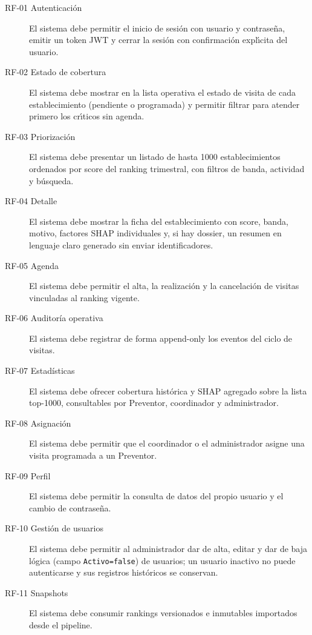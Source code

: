 \begin{description}
	\item[RF-01 Autenticaci\'on] El sistema debe permitir el inicio de sesi\'on con usuario y contrase\~na, emitir un token JWT y cerrar la sesi\'on con confirmaci\'on expl\'{\i}cita del usuario.
	\item[RF-02 Estado de cobertura] El sistema debe mostrar en la lista operativa el estado de visita de cada establecimiento (pendiente o programada)  y permitir filtrar para atender primero los cr\'{\i}ticos sin agenda.
	\item[RF-03 Priorizaci\'on] El sistema debe presentar un listado de hasta 1000 establecimientos ordenados por score del ranking trimestral, con filtros de banda, actividad y b\'usqueda.
	\item[RF-04 Detalle] El sistema debe mostrar la ficha del establecimiento con score, banda, motivo, factores SHAP individuales y, si hay dossier, un resumen en lenguaje claro generado sin enviar identificadores.
	\item[RF-05 Agenda] El sistema debe permitir el alta, la realizaci\'on y la cancelaci\'on de visitas vinculadas al ranking vigente. 
	\item[RF-06 Auditor\'ia operativa] El sistema debe registrar de forma append-only los eventos del ciclo de visitas.
	\item[RF-07 Estad\'isticas] El sistema debe ofrecer cobertura hist\'orica y SHAP agregado sobre la lista top-1000, consultables por Preventor, coordinador y administrador.
	\item[RF-08 Asignaci\'on] El sistema debe permitir que el coordinador o el administrador asigne una visita programada a un Preventor. 
	\item[RF-09 Perfil] El sistema debe permitir la consulta de datos del propio usuario y el cambio de contrase\~na.
	\item[RF-10 Gesti\'on de usuarios] El sistema debe permitir al administrador dar de alta, editar y dar de baja l\'ogica (campo \texttt{Activo=false}) de usuarios; un usuario inactivo no puede autenticarse y sus registros hist\'oricos se conservan.
	\item[RF-11 Snapshots] El sistema debe consumir rankings versionados e inmutables importados desde el pipeline.

\end{description}
